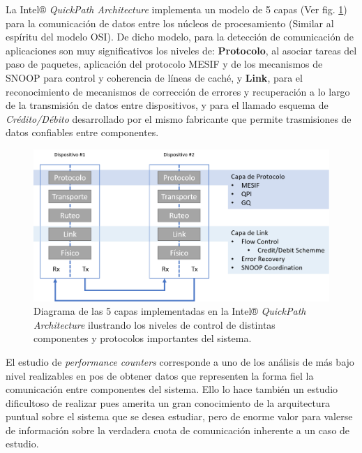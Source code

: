 La Intel® \emph{QuickPath Architecture} implementa un modelo de 5 capas (Ver fig. \ref{fig:5layersqpi}) para la comunicación de datos entre los núcleos de procesamiento (Similar al espíritu del modelo OSI). De dicho modelo, para la detección de comunicación de aplicaciones son muy significativos los niveles de: \textbf{Protocolo}, al asociar tareas del paso de paquetes, aplicación del protocolo MESIF y de los mecanismos de SNOOP para control y coherencia de líneas de caché, y \textbf{Link}, para el reconocimiento de mecanismos de corrección de errores y recuperación a lo largo de la transmisión de datos entre dispositivos, y para el llamado esquema de \emph{Crédito/Débito} desarrollado por el mismo fabricante que permite trasmisiones de datos confiables entre componentes.

\begin{figure}[!h]
	\centering
	\includegraphics[scale=.5]{imagenes/5layersqpi.png}
	\caption{Diagrama de las 5 capas implementadas en la Intel® \emph{QuickPath Architecture} ilustrando los niveles de control de distintas componentes y protocolos importantes del sistema.}
	\label{fig:5layersqpi}
\end{figure}

El estudio de \emph{performance counters} corresponde a uno de los análisis de más bajo nivel realizables en pos de obtener datos que representen la forma fiel la comunicación entre componentes del sistema. Ello lo hace también un estudio dificultoso de realizar pues amerita un gran conocimiento de la arquitectura puntual sobre el sistema que se desea estudiar, pero de enorme valor para valerse de información sobre la verdadera cuota de comunicación inherente a un caso de estudio.

